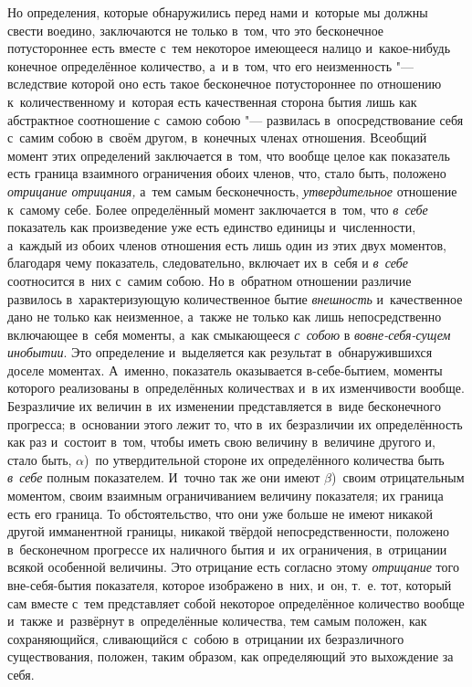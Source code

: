 Но определения, которые обнаружились перед нами и~которые мы должны свести
воедино, заключаются не только в~том, что это бесконечное потустороннее есть
вместе с~тем некоторое имеющееся налицо и~какое-нибудь конечное определённое
количество, а~и в~том, что его неизменность "--- вследствие которой оно есть
такое бесконечное потустороннее по отношению к~количественному и~которая есть
качественная сторона бытия лишь как абстрактное соотношение с~самою собою "---
развилась в~опосредствование себя с~самим собою в~своём другом, в~конечных
членах отношения. Всеобщий момент этих определений заключается в~том, что
вообще целое как показатель есть граница взаимного ограничения обоих членов,
что, стало быть, положено {\em отрицание отрицания,} а~тем самым бесконечность,
{\em утвердительное} отношение к~самому себе. Более определённый момент
заключается в~том, что {\em в~себе} показатель как произведение уже есть
единство единицы и~численности, а~каждый из обоих членов отношения есть лишь
один из этих двух моментов, благодаря чему показатель, следовательно, включает
их в~себя и {\em в~себе} соотносится в~них с~самим собою. Но в~обратном
отношении различие развилось в~характеризующую количественное бытие
{\em внешность} и~качественное дано не только как неизменное, а~также не только
как лишь непосредственно включающее в~себя моменты, а~как смыкающееся
{\em с~собою} в {\em вовне-себя-сущем инобытии}. Это определение и~выделяется
как результат в~обнаружившихся доселе моментах. А~именно, показатель
оказывается в-себе-бытием, моменты которого реализованы в~определённых
количествах и~в их изменчивости вообще. Безразличие их величин в~их изменении
представляется в~виде бесконечного прогресса; в~основании этого лежит то, что
в~их безразличии их определённость как раз и~состоит в~том, чтобы иметь свою
величину в~величине другого и, стало быть, $\alpha$)~по утвердительной стороне
их определённого количества быть {\em в~себе} полным показателем. И~точно так
же они имеют $\beta$)~своим отрицательным моментом, своим взаимным
ограничиванием величину показателя; их граница есть его граница. То
обстоятельство, что они уже больше не имеют никакой другой имманентной границы,
никакой твёрдой непосредственности, положено в~бесконечном
прогрессе их наличного бытия и~их ограничения, в~отрицании всякой особенной
величины. Это отрицание есть согласно этому {\em отрицание} того вне-себя-бытия
показателя, которое изображено в~них, и~он, т.~е. тот, который сам вместе с~тем
представляет собой некоторое определённое количество вообще и~также и~развёрнут
в~определённые количества, тем самым положен, как сохраняющийся, сливающийся
с~собою в~отрицании их безразличного существования, положен, таким образом, как
определяющий это выхождение за себя.


